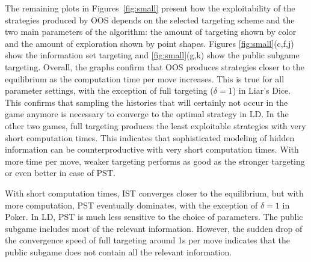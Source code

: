 \documentclass{aamas2015}
\begin{document}
The remaining plots in Figures~\ref{fig:small} present how the exploitability of the strategies produced by OOS depends on the selected targeting scheme and the two main parameters of the algorithm: the amount of targeting shown by color and the amount of exploration shown by point shapes. Figures \ref{fig:small}(c,f,j) show the information set targeting and \ref{fig:small}(g,k) show the public subgame targeting. Overall, the graphs confirm that OOS produces strategies closer to the equilibrium as the computation time per move increases. This is true for all parameter settings, with the exception of full targeting ($\delta=1$) in Liar's Dice. This confirms that sampling the histories that will certainly not occur in the game anymore is necessary to converge to the optimal strategy in LD.
In the other two games, full targeting produces the least exploitable strategies with very short computation times. This indicates that sophisticated modeling of hidden information can be counterproductive with very short computation times. With more time per move, weaker targeting performs as good as the stronger targeting or even better in case of PST.

With short computation times, IST converges closer to the equilibrium, but with more computation, PST eventually dominates, with the exception of $\delta=1$ in Poker. In LD, PST is much less sensitive to the choice of parameters. The public subgame includes most of the relevant information. However, the sudden drop of the convergence speed of full targeting around 1s per move indicates that the public subgame does not contain all the relevant information.

\end{document}
